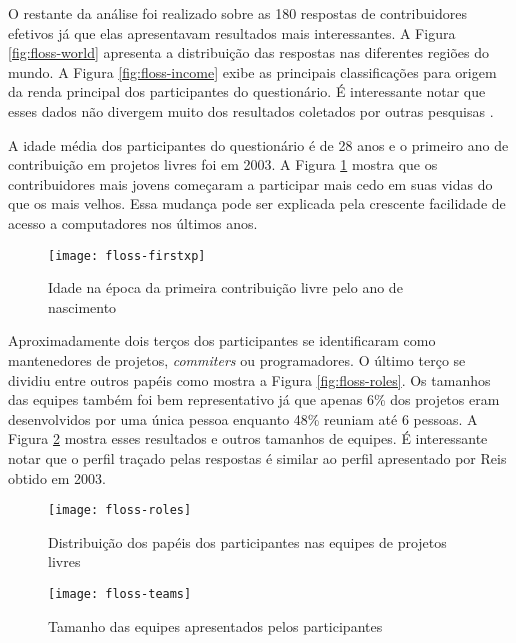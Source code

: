 
O restante da análise foi realizado sobre as 180 respostas de
contribuidores efetivos já que elas apresentavam resultados mais
interessantes. A Figura \ref{fig:floss-world} apresenta a distribuição
das respostas nas diferentes regiões do mundo. A Figura
\ref{fig:floss-income} exibe as principais classificações para origem
da renda principal dos participantes do questionário. É interessante
notar que esses dados não divergem muito dos resultados coletados por
outras pesquisas \cite{FlossStats}.

A idade média dos participantes do questionário é de 28 anos e o
primeiro ano de contribuição em projetos livres foi em 2003. A Figura
\ref{fig:floss-firstxp} mostra que os contribuidores mais jovens
começaram a participar mais cedo em suas vidas do que os mais
velhos. Essa mudança pode ser explicada pela crescente facilidade de
acesso a computadores nos últimos anos.

\begin{figure}
  \centering
  \texttt{[image: floss-firstxp]}
  \caption{Idade na época da primeira contribuição livre pelo ano de
    nascimento}
  \label{fig:floss-firstxp}
\end{figure}

Aproximadamente dois terços dos participantes se identificaram como
mantenedores de projetos, \textit{commiters} ou programadores. O
último terço se dividiu entre outros papéis como mostra a Figura
\ref{fig:floss-roles}. Os tamanhos das equipes também foi bem
representativo já que apenas 6\% dos projetos eram desenvolvidos por
uma única pessoa enquanto 48\% reuniam até 6 pessoas. A Figura
\ref{fig:floss-teams} mostra esses resultados e outros tamanhos de
equipes. É interessante notar que o perfil traçado pelas respostas é
similar ao perfil apresentado por Reis \cite{Reis2003} obtido em 2003.


\begin{figure}[htb]
  \begin{minipage}[t]{0.55\linewidth}
    \centering
    \texttt{[image: floss-roles]}
    \caption{Distribuição dos papéis dos participantes nas equipes de
      projetos livres}
    \label{fig:floss-roles}
  \end{minipage}
  \begin{minipage}[t]{0.45\linewidth}
    \centering
    \texttt{[image: floss-teams]}
    \caption{Tamanho das equipes apresentados pelos participantes}
    \label{fig:floss-teams}
  \end{minipage}
\end{figure}

